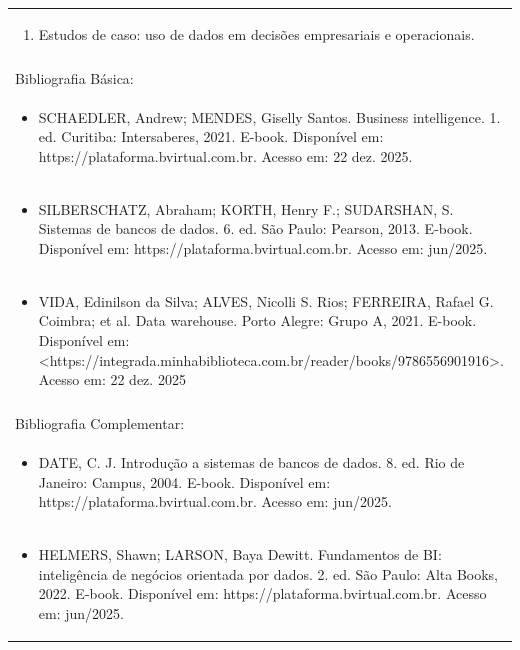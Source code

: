\documentclass[11pt]{article}
\begin{document}
\begin{center}
\begin{longtable}{|p{4cm}|p{4cm}|p{4cm}|p{4cm}|}
\multicolumn{4}{|p{\dimexpr 16cm + 6\tabcolsep\relax}|}{\begin{enumerate}[start=10]\item Estudos de caso: uso de dados em decisões empresariais e operacionais.\end{enumerate}}\\
\multicolumn{4}{|p{\dimexpr 16cm + 6\tabcolsep\relax}|}{}\\
\hline
\multicolumn{4}{|p{16cm}|}{Bibliografia Básica:}\\*
\multicolumn{4}{|p{\dimexpr 16cm + 6\tabcolsep\relax}|}{\begin{itemize}\item SCHAEDLER, Andrew; MENDES, Giselly Santos. Business intelligence. 1. ed. Curitiba: Intersaberes, 2021. E-book. Disponível em: https://plataforma.bvirtual.com.br. Acesso em: 22 dez. 2025.\end{itemize}}\\
\multicolumn{4}{|p{\dimexpr 16cm + 6\tabcolsep\relax}|}{\begin{itemize}\item SILBERSCHATZ, Abraham; KORTH, Henry F.; SUDARSHAN, S. Sistemas de bancos de dados. 6. ed. São Paulo: Pearson, 2013. E-book. Disponível em: https://plataforma.bvirtual.com.br. Acesso em: jun/2025.\end{itemize}}\\
\multicolumn{4}{|p{\dimexpr 16cm + 6\tabcolsep\relax}|}{\begin{itemize}\item VIDA, Edinilson da Silva; ALVES, Nicolli S. Rios; FERREIRA, Rafael G. Coimbra; et al. Data warehouse. Porto Alegre: Grupo A, 2021. E-book. Disponível em: <https://integrada.minhabiblioteca.com.br/reader/books/9786556901916>. Acesso em: 22 dez. 2025\end{itemize}}\\
\multicolumn{4}{|p{16cm}|}{}\\
\hline
\multicolumn{4}{|p{16cm}|}{Bibliografia Complementar:}\\*
\multicolumn{4}{|p{\dimexpr 16cm + 6\tabcolsep\relax}|}{\begin{itemize}\item DATE, C. J. Introdução a sistemas de bancos de dados. 8. ed. Rio de Janeiro: Campus, 2004. E-book. Disponível em: https://plataforma.bvirtual.com.br. Acesso em: jun/2025.\end{itemize}}\\
\multicolumn{4}{|p{\dimexpr 16cm + 6\tabcolsep\relax}|}{\begin{itemize}\item HELMERS, Shawn; LARSON, Baya Dewitt. Fundamentos de BI: inteligência de negócios orientada por dados. 2. ed. São Paulo: Alta Books, 2022. E-book. Disponível em: https://plataforma.bvirtual.com.br. Acesso em: jun/2025.\end{itemize}}\\

\end{longtable}
\end{center}
\end{document}
